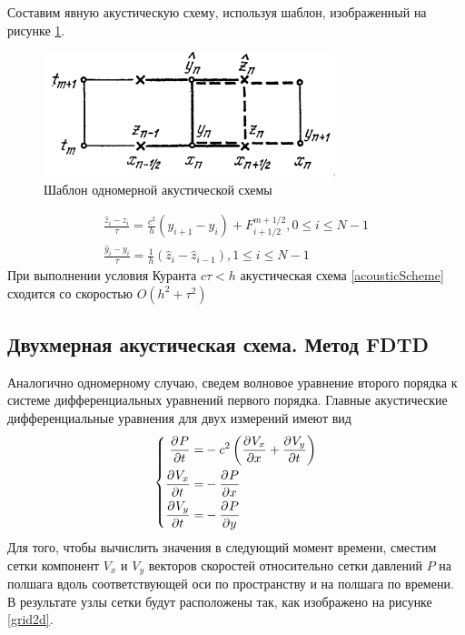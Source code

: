 \documentclass[a4paper, fontsize=14pt]{article}
\begin{document}
Составим явную акустическую схему, используя шаблон, изображенный на рисунке \ref{acousticTpl}.
\begin{figure}[h]
    \centering
    \includegraphics{scheme1d}
    \caption{Шаблон одномерной акустической схемы}
    \label{acousticTpl}
\end{figure}
\begin{equation}
    \label{acousticScheme}
    \begin{gathered}
        \frac{\hat{z}_i - z_i}{\tau}=\frac{c^2}{h} (y_{i+1} - y_{i}) + F^{m+1/2}_{i+1/2}, 0\leq i\leq N-1\\
        \frac{\hat{y}_i - y_i}{\tau}=\frac{1}{h}(\hat{z}_i - \hat{z}_{i-1}), 1 \leq i \leq N-1
    \end{gathered}
\end{equation}
При выполнении условия Куранта $c\tau<h$ акустическая схема \ref{acousticScheme} сходится со
скоростью $O(h^2+\tau^2)$  \cite{kal}
\subsection{Двухмерная акустическая схема. Метод FDTD}
Аналогично одномерному случаю, сведем волновое уравнение второго порядка к системе дифференциальных уравнений
первого порядка.
Главные акустические дифференциальные уравнения для двух измерений имеют вид
\begin{equation}
	\left\{
	\begin{aligned}
		\label{acousticGov}
		\frac{\partial ^ {  } P}{\partial t ^ {  } } =& - c^2\left(\frac{\partial ^ {  } V_x}{\partial x ^ {  } }+\frac{\partial ^ {  } V_y}{\partial t ^ {  } }\right)\\
		\frac{\partial ^ {  } V_x}{\partial t ^ {  } } =& - \frac{\partial ^ {  } P}{\partial x ^ {  } }\\
		\frac{\partial ^ {  } V_y}{\partial t ^ {  } } =& - \frac{\partial ^ {  } P}{\partial y ^ {  } }
	\end{aligned}
	\right.
\end{equation}
Для того, чтобы вычислить значения в следующий момент времени, сместим сетки компонент $V_x$ и $V_y$
векторов скоростей относительно сетки давлений $P$ на полшага вдоль соответствующей оси по пространству и на полшага
по времени\cite{ufdtd}. В результате узлы сетки будут расположены так, как изображено на рисунке \ref{grid2d}.
\end{document}

